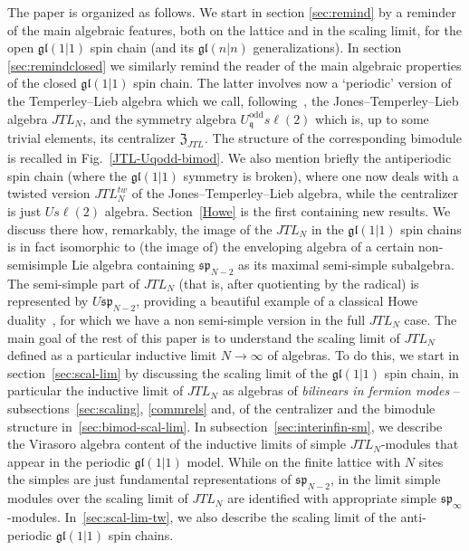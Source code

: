 \documentclass[11pt]{article}
\newcommand{\q}{\mathfrak{q}}
\newcommand{\JTL}[1]{JTL_{#1}}
\newcommand{\LQGodd}{U^{\text{odd}}_{\q} s\ell(2)}
\newcommand{\spinf}{\ssp_{\infty}}
\newcommand{\gl}{\mathfrak{gl}}
\newcommand{\ssp}{\mathfrak{sp}}
\newcommand{\cent}{\mathfrak{Z}}
\newcommand{\centJTL}{\cent_{\JTL{}}}
\theoremstyle{definition}
\begin{document}
The paper is organized as follows. We start in section \ref{sec:remind} by a reminder of the main algebraic features, both on the lattice and in the scaling limit, for the open $\gl(1|1)$ spin chain (and its $\gl(n|n)$ generalizations). In section \ref{sec:remindclosed} we similarly remind the reader of the main algebraic properties of the closed $\gl(1|1)$ spin chain. The latter involves now a `periodic' version of the Temperley--Lieb algebra which we call, following~\cite{ReadSaleur07-1}, the Jones--Temperley--Lieb algebra $\JTL{N}$, and the symmetry algebra $\LQGodd$ which is, up to some trivial elements, its centralizer $\centJTL$. The structure of the corresponding bimodule is recalled in Fig.~\ref{JTL-Uqodd-bimod}. We also mention briefly the antiperiodic spin chain (where the $\gl(1|1)$ symmetry is broken), where one now deals with a twisted version $\JTL{N}^{tw}$ of the Jones--Temperley--Lieb algebra, while the centralizer is just $U s\ell(2)$ algebra. Section~\ref{Howe} is the first containing new results. We discuss there how, remarkably, the image of the $\JTL{N}$ in the $\gl(1|1)$ spin chains is in fact isomorphic to (the image of) the enveloping algebra of a certain non-semisimple Lie algebra containing $\ssp_{N-2}$ as its maximal semi-simple subalgebra. The semi-simple part of $\JTL{N}$ (that is, after quotienting by the radical) is represented by $U \ssp_{N-2}$, providing a beautiful example of a classical Howe duality~\cite{H3}, for which we have a non semi-simple version in the full $\JTL{N}$ case. The main goal of the rest of this paper is to understand
 the scaling limit of $\JTL{N}$ defined as a particular inductive limit $N\to\infty$ of algebras. To do this, we start in section~\ref{sec:scal-lim} by discussing the scaling limit of the $\gl(1|1)$ spin chain, in particular the inductive limit of $\JTL{N}$ as algebras of \textit{bilinears in fermion modes} -- subsections~\ref{sec:scaling},   \ref{commrels} and, of  the centralizer and the bimodule structure in~\ref{sec:bimod-scal-lim}. In subsection~\ref{sec:interinfin-sm}, we describe the Virasoro algebra content of the inductive limits of simple $\JTL{N}$-modules that appear in the periodic $\gl(1|1)$ model.  While on the finite lattice with $N$ sites the simples are just fundamental representations of $\ssp_{N-2}$, in the limit simple modules over the scaling limit of $\JTL{N}$ are identified with appropriate simple $\spinf$-modules. In~\ref{sec:scal-lim-tw}, we also describe the scaling limit of the anti-periodic $\gl(1|1)$ spin chains.
\end{document}
